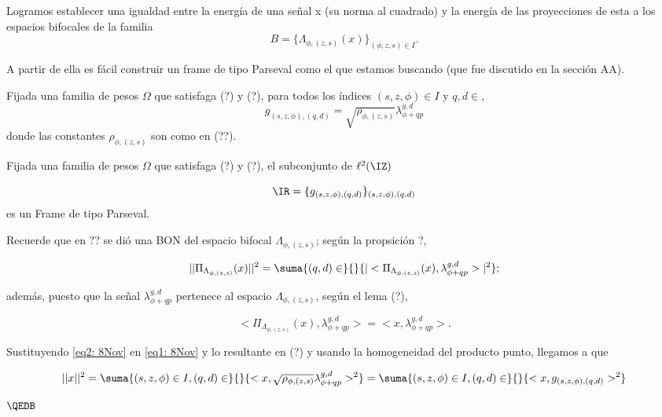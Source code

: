 
Logramos establecer una igualdad entre
la energía de una señal x (su norma al cuadrado)
y la energía de las proyecciones de esta a los espacios bifocales de la familia
\[
B=\{ \Lambda_{\phi, (z,s)}(x)\}_{(\phi, z, s) \in I}.
\]

A partir de ella
es fácil construir
un frame de tipo Parseval como el que estamos buscando
(que fue discutido en la sección AA).


\begin{defi}
Fijada una familia de pesos $\Omega$ que satisfaga (?) y (?),
para todos los índices $(s,z,\phi) \in I$ y $q,d \in $,
\begin{equation}
\label{eq4: 8Nov}
g_{(s,z, \phi), (q,d)}= \sqrt{\rho_{\phi, (z,s)}} \lambda_{\phi+qp}^{g,d}
\end{equation}
donde las constantes $\rho_{\phi, (z,s)}$ son como en (??).
\end{defi}

\begin{prop}
Fijada una familia de pesos $\Omega$ que satisfaga (?) y (?), el subconjunto de $\ell^{2}(\IZ)$

\begin{equation}
\label{eq5: 8Nov}
\IR= \{ g_{(s,z, \phi), (q,d)} \}_{(s,z,\phi), (q,d)}
\end{equation}
es un Frame de tipo Parseval.
\end{prop}
\begin{dem}
Recuerde que en ?? se dió una BON del espacio bifocal $\Lambda_{\phi, (z,s)}$; según
la propsición ?,

\begin{equation}
\label{eq1: 8Nov}
||\Pi_{\Lambda_{\phi, (z,s)}}(x) ||^{2}= \suma{(q,d) \in }{}{|< \Pi_{\Lambda_{\phi, (z,s)}}(x), \lambda_{\phi+qp}^{g,d}>|^{2}};
\end{equation}

además, puesto que la señal $\lambda_{\phi+qp}^{g,d}$ pertenece al espacio
$ \Lambda_{\phi, (z,s)}$, según el lema (?),

\begin{equation}
\label{eq2: 8Nov}
< \Pi_{\Lambda_{\phi, (z,s)}}(x), \lambda_{\phi+qp}^{g,d}> = <x, \lambda_{\phi+qp}^{g,d}>.
\end{equation}

Sustituyendo \eqref{eq2: 8Nov} en \eqref{eq1: 8Nov} y lo resultante en (?) y
usando la homogeneidad del producto punto, llegamos a que

\begin{equation}
\label{eq3: 8Nov}
||x||^{2}= \suma{(s, z, \phi) \in I, (q,d) \in }{}{<x, \sqrt{\rho_{\phi, (z,s)}} \lambda_{\phi+qp}^{g,d}>^{2}}
=\suma{(s, z, \phi) \in I, (q,d) \in }{}{<x,g_{(s,z, \phi), (q,d)}>^{2}}
\end{equation}

$\QEDB$
\end{dem}

